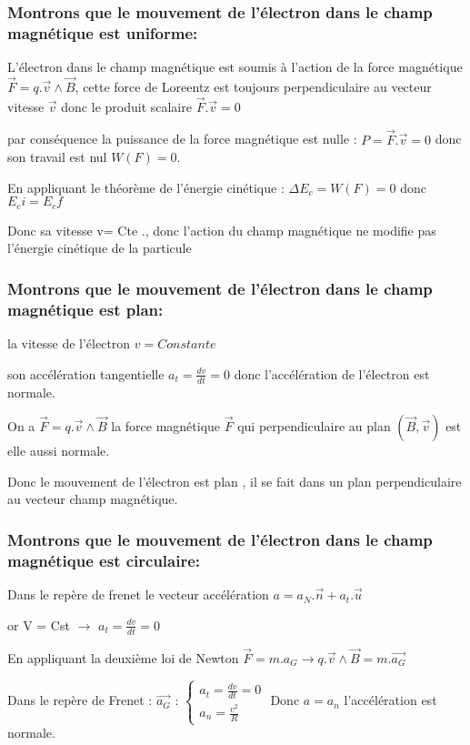 \documentclass[12pt]{article}
\begin{document}
\subsubsection{Montrons que le mouvement de l'électron dans le champ magnétique est uniforme:}
L'électron dans le champ magnétique est soumis à l'action de la force magnétique $\vec{F} = q.\vec{v} \wedge \vec{B}$, cette force de Loreentz est
toujours perpendiculaire au vecteur vitesse $\vec{v}$ donc le produit scalaire $\vec{F}.\vec{v} = 0$ 

par conséquence la puissance de la force magnétique est nulle : $P = \vec{F}.\vec{v} = 0$ donc son travail est nul $W(F) = 0$.

En appliquant le théorème de l'énergie cinétique : $\Delta{E_c} = W(F) = 0$ donc $E_ci = E_cf$

Donc sa vitesse v= Cte ., donc l'action du champ magnétique ne modifie pas l'énergie cinétique de la particule
\subsubsection{Montrons que le mouvement de l'électron dans le champ magnétique est plan:}
la vitesse de l'électron $v=Constante$

son accélération tangentielle $a_t = \frac{dv}{dt} = 0$ donc l'accélération de l'électron est normale.

On a $\vec{F} = q.\vec{v} \wedge \vec{B}$ la force magnétique $\vec{F}$
qui perpendiculaire au plan $(\vec{B}, \vec{v})$ est elle aussi normale.

Donc le mouvement de l'électron est plan , il se fait dans un plan perpendiculaire au vecteur champ magnétique.

\subsubsection{Montrons que le mouvement de l'électron dans le champ magnétique est circulaire: }
Dans le repère de frenet le vecteur accélération $a = a_N.\vec{n} + a_t.\vec{u}$

or V = Cst $\rightarrow$ $a_t = \frac{dv}{dt} = 0$

En appliquant la deuxième loi de Newton $\vec{F} = m.a_G\rightarrow  q.\vec{v} \wedge \vec{B} = m.\vec{a_G}$

Dans le repère de Frenet : $\vec{a_G}$ : $\begin{cases}a_t = \frac{dv}{dt} = 0\\ a_n = \frac{v^2}{R}\end{cases}$
 Donc $a = a_n$ l'accélération est normale.
\end{document}
